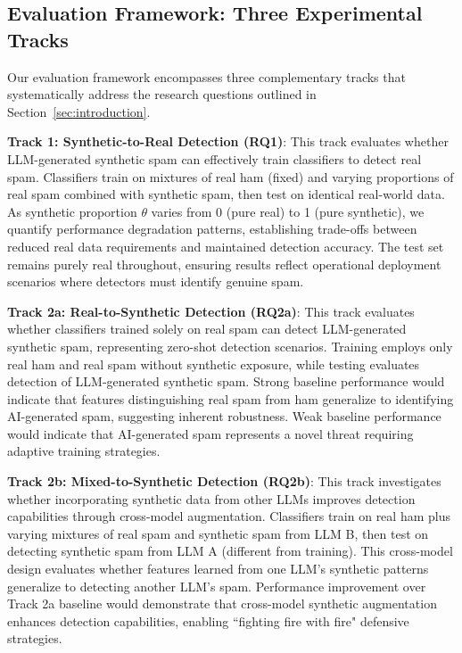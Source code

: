 \subsection{Evaluation Framework: Three Experimental Tracks}
Our evaluation framework encompasses three complementary tracks that systematically address the research questions outlined in Section~\ref{sec:introduction}. 


\textbf{Track 1: Synthetic-to-Real Detection (RQ1)}: This track evaluates whether LLM-generated synthetic spam can effectively train classifiers to detect real spam. Classifiers train on mixtures of real ham (fixed) and varying proportions of real spam combined with synthetic spam, then test on identical real-world data. As synthetic proportion $\theta$ varies from 0 (pure real) to 1 (pure synthetic), we quantify performance degradation patterns, establishing trade-offs between reduced real data requirements and maintained detection accuracy. The test set remains purely real throughout, ensuring results reflect operational deployment scenarios where detectors must identify genuine spam.

\textbf{Track 2a: Real-to-Synthetic Detection (RQ2a)}: This track evaluates whether classifiers trained solely on real spam can detect LLM-generated synthetic spam, representing zero-shot detection scenarios. Training employs only real ham and real spam without synthetic exposure, while testing evaluates detection of LLM-generated synthetic spam. Strong baseline performance would indicate that features distinguishing real spam from ham generalize to identifying AI-generated spam, suggesting inherent robustness. Weak baseline performance would indicate that AI-generated spam represents a novel threat requiring adaptive training strategies.

\textbf{Track 2b: Mixed-to-Synthetic Detection (RQ2b)}: This track investigates whether incorporating synthetic data from other LLMs improves detection capabilities through cross-model augmentation. Classifiers train on real ham plus varying mixtures of real spam and synthetic spam from LLM B, then test on detecting synthetic spam from LLM A (different from training). This cross-model design evaluates whether features learned from one LLM's synthetic patterns generalize to detecting another LLM's spam. Performance improvement over Track 2a baseline would demonstrate that cross-model synthetic augmentation enhances detection capabilities, enabling ``fighting fire with fire" defensive strategies.
